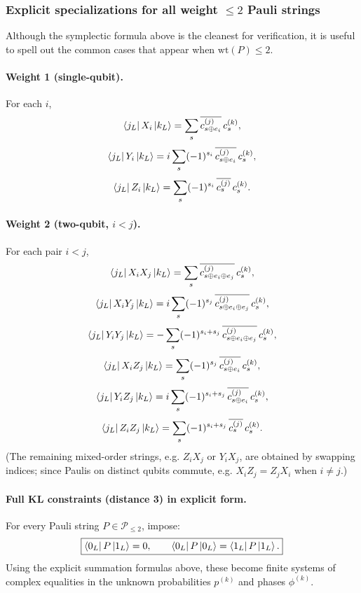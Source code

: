 \documentclass[11pt]{article}
\begin{document}
\subsubsection{Explicit specializations for all weight \texorpdfstring{$\le 2$}{<=2} Pauli strings}

Although the symplectic formula above is the cleanest for verification, it is useful to spell out
the common cases that appear when \(\mathrm{wt}(P)\le 2\).

\paragraph{Weight 1 (single-qubit).}
For each \(i\),
\[
\bra{j_L}X_i\ket{k_L}=\sum_{s}\overline{c^{(j)}_{s\oplus e_i}}\,c^{(k)}_{s},
\]
\[
\bra{j_L}Y_i\ket{k_L}=i\sum_{s}(-1)^{s_i}\,\overline{c^{(j)}_{s\oplus e_i}}\,c^{(k)}_{s},
\]
\[
\bra{j_L}Z_i\ket{k_L}=\sum_{s}(-1)^{s_i}\,\overline{c^{(j)}_{s}}\,c^{(k)}_{s}.
\]

\paragraph{Weight 2 (two-qubit, \(i<j\)).}
For each pair \(i<j\),
\[
\bra{j_L}X_iX_j\ket{k_L}=\sum_{s}\overline{c^{(j)}_{s\oplus e_i\oplus e_j}}\,c^{(k)}_{s},
\]
\[
\bra{j_L}X_iY_j\ket{k_L}=i\sum_{s}(-1)^{s_j}\,\overline{c^{(j)}_{s\oplus e_i\oplus e_j}}\,c^{(k)}_{s},
\]
\[
\bra{j_L}Y_iY_j\ket{k_L}=-\sum_{s}(-1)^{s_i+s_j}\,\overline{c^{(j)}_{s\oplus e_i\oplus e_j}}\,c^{(k)}_{s},
\]
\[
\bra{j_L}X_iZ_j\ket{k_L}=\sum_{s}(-1)^{s_j}\,\overline{c^{(j)}_{s\oplus e_i}}\,c^{(k)}_{s},
\]
\[
\bra{j_L}Y_iZ_j\ket{k_L}=i\sum_{s}(-1)^{s_i+s_j}\,\overline{c^{(j)}_{s\oplus e_i}}\,c^{(k)}_{s},
\]
\[
\bra{j_L}Z_iZ_j\ket{k_L}=\sum_{s}(-1)^{s_i+s_j}\,\overline{c^{(j)}_{s}}\,c^{(k)}_{s}.
\]
(The remaining mixed-order strings, e.g. \(Z_iX_j\) or \(Y_iX_j\), are obtained by swapping indices;
since Paulis on distinct qubits commute, e.g. \(X_iZ_j=Z_jX_i\) when \(i\neq j\).)

\paragraph{Full KL constraints (distance 3) in explicit form.}
For every Pauli string \(P\in\mathcal{P}_{\le 2}\), impose:
\[
\boxed{
\bra{0_L}P\ket{1_L}=0,
\qquad
\bra{0_L}P\ket{0_L}=\bra{1_L}P\ket{1_L}.
}
\]
Using the explicit summation formulas above, these become finite systems of complex equalities
in the unknown probabilities \(p^{(k)}\) and phases \(\phi^{(k)}\).
\end{document}
